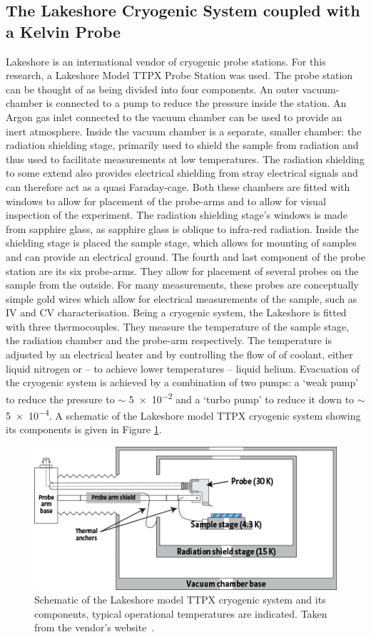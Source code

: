 \subsection{The Lakeshore Cryogenic System coupled with a \McA{} Kelvin Probe}
Lakeshore is an international vendor of cryogenic probe stations. For this research, a Lakeshore Model TTPX Probe Station was used. The probe station can be thought of as being divided into four components. An outer vacuum-chamber is connected to a pump to reduce the pressure inside the station. An Argon gas inlet connected to the vacuum chamber can be used to provide an inert atmosphere. Inside the vacuum chamber is a separate, smaller chamber: the radiation shielding stage, primarily used to shield the sample from \ir{} radiation and thus used to facilitate measurements at low temperatures. The radiation shielding to some extend also provides electrical shielding from stray electrical signals and can therefore act as a quasi Faraday-cage. Both these chambers are fitted with windows to allow for placement of the probe-arms and to allow for visual inspection of the experiment. The radiation shielding stage's windows is made from sapphire glass, as sapphire glass is oblique to infra-red radiation. Inside the shielding stage is placed the sample stage, which allows for mounting of samples and can provide an electrical ground. The fourth and last component of the probe station are its six probe-arms. They allow for placement of several probes on the sample from the outside. For many measurements, these probes are conceptually simple gold wires which allow for electrical measurements of the sample, such as IV and CV characterisation. Being a cryogenic system, the Lakeshore is fitted with three thermocouples. They measure the temperature of the sample stage, the radiation chamber and the probe-arm respectively. The temperature is adjusted by an electrical heater and by controlling the flow of of coolant, either liquid nitrogen or -- to achieve lower temperatures -- liquid helium. Evacuation of the cryogenic system is achieved by a combination of two pumps: a `weak pump' to reduce the pressure to $\sim$ \num{5e-2} and a `turbo pump' to reduce it down to $\sim$ \num{5e-4}. A schematic of the Lakeshore model TTPX cryogenic system showing its components is given in Figure \ref{fig:McAscheme}.\\
\begin{figure}
\centering
	\includegraphics[width=0.8\linewidth]{./figs/Config_TTPX}
	\caption{Schematic of the Lakeshore model TTPX cryogenic system and its components, typical operational temperatures are indicated. Taken from the vendor's website~\cite{lakeshore}.}
	\label{fig:McAscheme}
\end{figure}
